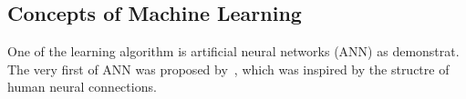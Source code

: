 \subsection{Concepts of Machine Learning}
One of the learning algorithm is artificial neural networks (ANN) as demonstrat. The very first of ANN was proposed by~\citet{McCulloch_1943}, which was inspired by the structre of human neural connections. 